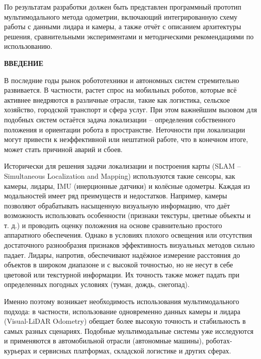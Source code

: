 По результатам разработки должен быть представлен программный прототип мультимодального метода одометрии, включающий интегрированную схему работы с данными лидара и камеры, а также отчёт с описанием архитектуры решения, сравнительными экспериментами и методическими рекомендациями по использованию.





\newpage
\renewcommand{\contentsname}{\centerline{\large СОДЕРЖАНИЕ}}
\tableofcontents

\newpage
\begin{center}
  \textbf{\large ВВЕДЕНИЕ}
\end{center}

В последние годы рынок робототехники и автономных систем стремительно развивается. В частности, растет спрос на мобильных роботов, 
которые всё активнее внедряются в различные отрасли, такие как логистика, сельское хозяйство, городской транспорт и сфера услуг. 
При этом важнейшим вызовом для подобных систем остаётся задача локализации – определения собственного положения и ориентации робота в пространстве. 
Неточности при локализации могут привести к неэффективной или нештатной работе, что в конечном итоге, может стать причиной аварий и сбоев.

Исторически для решения задачи локализации и построения карты (SLAM – Simultaneous Localization and Mapping) используются такие сенсоры, 
как камеры, лидары, IMU (инерционные датчики) и колёсные одометры. Каждая из модальностей имеет ряд преимуществ и недостатков. Например, 
камеры позволяют обрабатывать насыщенную визуальную информацию, что даёт возможность использовать особенности (признаки текстуры, цветные объекты и т. д.) 
и проводить оценку положения на основе сравнительно простого аппаратного обеспечения. Однако в условиях плохого освещения или отсутствия достаточного 
разнообразия признаков эффективность визуальных методов сильно падает. Лидары, напротив, обеспечивают надёжное измерение расстояния 
до объектов в широком диапазоне и с высокой точностью, но не несут в себе цветовой или текстурной информации. Их точность также может падать при определенных погодных условиях (туман, дождь, снегопад).

Именно поэтому возникает необходимость использования мультимодального подхода: в частности, использование одновременно данных камеры и лидара (Visual-LiDAR Odometry) 
обещает более высокую точность и стабильность в самых разных сценариях. Подобные мультимодальные системы уже исследуются и применяются в автомобильной 
отрасли (автономные машины), роботах-курьерах и сервисных платформах, складской логистике и других сферах.

